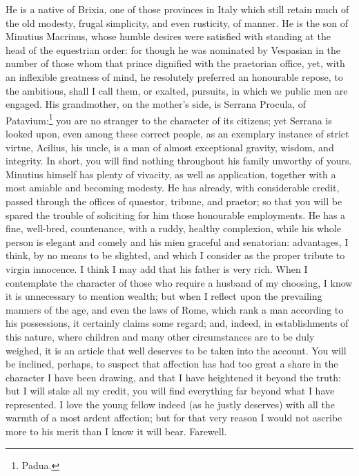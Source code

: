 He is a native of Brixia, one of those provinces in Italy which still
retain much of the old modesty, frugal simplicity, and even rusticity, of
manner. He is the son of Minutius Macrinus, whose humble desires were
satisfied with standing at the head of the equestrian order: for though he
was nominated by Vespasian in the number of those whom that prince
dignified with the praetorian office, yet, with an inflexible greatness of
mind, he resolutely preferred an honourable repose, to the ambitious,
shall I call them, or exalted, pursuits, in which we public men are
engaged. His grandmother, on the mother's side, is Serrana Procula, of
Patavium:\footnote{Padua.}
you are no stranger to the character of its citizens; yet Serrana is
looked upon, even among these correct people, as an exemplary instance of
strict virtue, Acilius, his uncle, is a man of almost exceptional gravity,
wisdom, and integrity. In short, you will find nothing throughout his
family unworthy of yours. Minutius himself has plenty of vivacity, as well
as application, together with a most amiable and becoming modesty. He has
already, with considerable credit, passed through the offices of quaestor,
tribune, and praetor; so that you will be spared the trouble of soliciting
for him those honourable employments. He has a fine, well-bred,
countenance, with a ruddy, healthy complexion, while his whole person is
elegant and comely and his mien graceful and senatorian: advantages, I
think, by no means to be slighted, and which I consider as the proper
tribute to virgin innocence. I think I may add that his father is very
rich. When I contemplate the character of those who require a husband of
my choosing, I know it is unnecessary to mention wealth; but when I
reflect upon the prevailing manners of the age, and even the laws of Rome,
which rank a man according to his possessions, it certainly claims some
regard; and, indeed, in establishments of this nature, where children and
many other circumstances are to be duly weighed, it is an article that
well deserves to be taken into the account. You will be inclined, perhaps,
to suspect that affection has had too great a share in the character I
have been drawing, and that I have heightened it beyond the truth: but I
will stake all my credit, you will find everything far beyond what I have
represented. I love the young fellow indeed (as he justly deserves) with
all the warmth of a most ardent affection; but for that very reason I
would not ascribe more to his merit than I know it will bear. Farewell.


